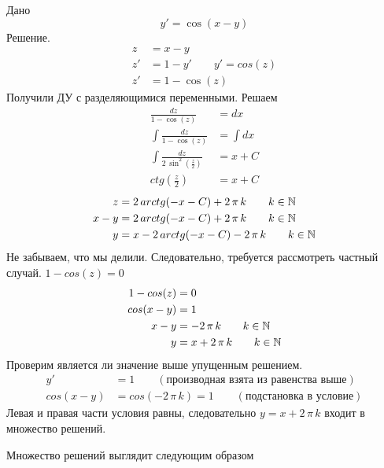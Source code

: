 \begin{Example}
    Дано
    \[
        y' = \cos(x - y)
    \]
    Решение.
    \begin{align*}
        z &= x - y\\
        z' &= 1 - y' \qquad y' = cos(z)\\
        z' &= 1 - \cos(z) 
    \end{align*}
    Получили ДУ с разделяющимися переменными. Решаем
    \begin{align*}
        \frac{dz}{1- \cos(z)} &= dx\\
        \int \frac{dz}{1- \cos(z)} &= \int dx\\
        \int \frac{dz}{2\, \sin^2 \left(\frac{z}{2}\right)} &= x + C\\
        ctg\left(\frac{z}{2}\right) &= x + C
    \end{align*} 
    \begin{align*}
        z &= 2\,arctg(-x-C) + 2\,\pi\,k \qquad k \in \mathbb{N}\\
        x - y &= 2\,arctg(-x-C) + 2\,\pi\,k \qquad k \in \mathbb{N}\\
        y &= x - 2\,arctg(-x-C) - 2\,\pi\,k \qquad k \in \mathbb{N}
    \end{align*}
    Не забываем, что мы делили. Следовательно, требуется рассмотреть частный случай. $1 - cos(z) = 0$
    \begin{align*}
        1 - cos(z) &= 0\\
        cos(x - y) &= 1\\
        x - y &= -2\,\pi\,k \qquad k \in \mathbb{N}\\
        y &= x + 2\,\pi\,k \qquad k \in \mathbb{N}
    \end{align*} 
    Проверим является ли значение выше упущенным решением.
    \begin{align*}
        y'& = 1 \qquad (\text{производная взята из равенства выше})\\
        cos(x - y) &= cos(-2\,\pi\,k) = 1 \qquad (\text{подстановка в  условие})
    \end{align*}
    Левая и правая части условия равны, следовательно $y = x + 2\,\pi\,k$ входит в множество решений.
    
    \pagebreak
    
    Множество решений выглядит следующим образом
    \begin{figure}[h]
        \noindent{}
    \end{figure}
\end{Example}